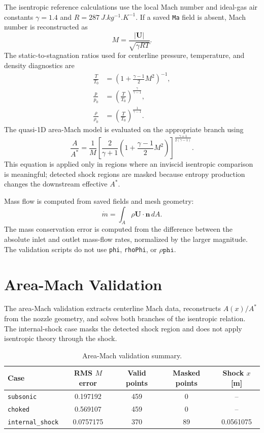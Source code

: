 \documentclass[11pt,a4paper]{article}
\begin{document}
The isentropic reference calculations use the local Mach number and ideal-gas air constants \(\gamma=1.4\) and \(R=\SI{287}{J.kg^{-1}.K^{-1}}\). If a saved \texttt{Ma} field is absent, Mach number is reconstructed as
\begin{equation}
M = \frac{|\mathbf{U}|}{\sqrt{\gamma R T}} .
\end{equation}
The static-to-stagnation ratios used for centerline pressure, temperature, and density diagnostics are
\begin{align}
\frac{T}{T_0} &=
\left(1+\frac{\gamma-1}{2}M^2\right)^{-1}, \\
\frac{p}{p_0} &=
\left(\frac{T}{T_0}\right)^{\frac{\gamma}{\gamma-1}}, \\
\frac{\rho}{\rho_0} &=
\left(\frac{T}{T_0}\right)^{\frac{1}{\gamma-1}} .
\end{align}
The quasi-1D area-Mach model is evaluated on the appropriate branch using
\begin{equation}
\frac{A}{A^*} = \frac{1}{M} \left[ \frac{2}{\gamma + 1} \left( 1 + \frac{\gamma - 1}{2} M^2 \right) \right]^{\frac{\gamma + 1}{2(\gamma - 1)}} .
\end{equation}
This equation is applied only in regions where an inviscid isentropic comparison is meaningful; detected shock regions are masked because entropy production changes the downstream effective \(A^*\).

Mass flow is computed from saved fields and mesh geometry:
\begin{equation}
\dot{m}=\int_A \rho \mathbf{U}\cdot\mathbf{n}\,dA .
\end{equation}
The mass conservation error is computed from the difference between the absolute inlet and outlet mass-flow rates, normalized by the larger magnitude. The validation scripts do not use \texttt{phi}, \texttt{rhoPhi}, or \(\rho\texttt{phi}\).

\section{Area-Mach Validation}

The area-Mach validation extracts centerline Mach data, reconstructs \(A(x)/A^*\) from the nozzle geometry, and solves both branches of the isentropic relation. The internal-shock case masks the detected shock region and does not apply isentropic theory through the shock.

\begin{table}[tbp]
\centering
\caption{Area-Mach validation summary.}
\label{tab:area-mach}
\small
\begin{tabular}{lcccc}
\toprule
Case & RMS \(M\) error & Valid points & Masked points & Shock \(x\) [m] \\
\midrule
\texttt{subsonic} & 0.197192 & 459 & 0 & -- \\
\texttt{choked} & 0.569107 & 459 & 0 & -- \\
\texttt{internal\_shock} & 0.0757175 & 370 & 89 & 0.0561075 \\
\bottomrule
\end{tabular}
\end{table}
\end{document}
